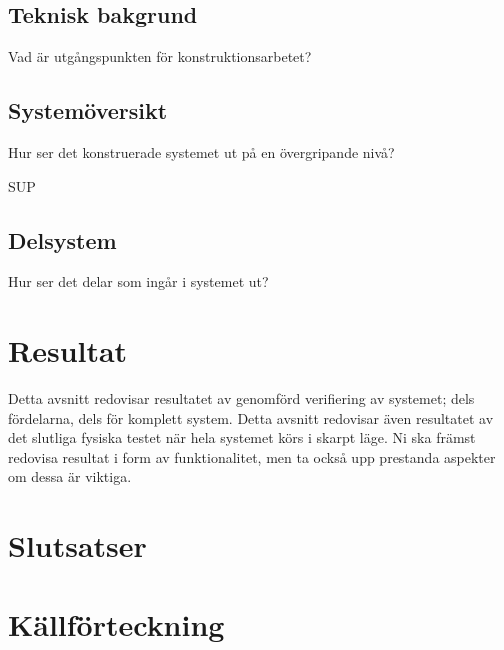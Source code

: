 \documentclass{article}
\begin{document}
\subsection{Teknisk bakgrund}
Vad är utgångspunkten för konstruktionsarbetet?

\subsection{Systemöversikt}
Hur ser det konstruerade systemet ut på en övergripande nivå?

SUP

\subsection{Delsystem}
Hur ser det delar som ingår i systemet ut?

\section{Resultat}
Detta avsnitt redovisar resultatet av genomförd verifiering av systemet; dels fördelarna, dels för 
komplett system. Detta avsnitt redovisar även resultatet av det slutliga fysiska testet när hela systemet 
körs i skarpt läge. Ni ska främst redovisa resultat i form av funktionalitet, men ta också upp prestanda 
aspekter om dessa är viktiga.  
\section{Slutsatser}
\newpage
\section{Källförteckning}
\printbibliography[title=\n]
\end{document}
